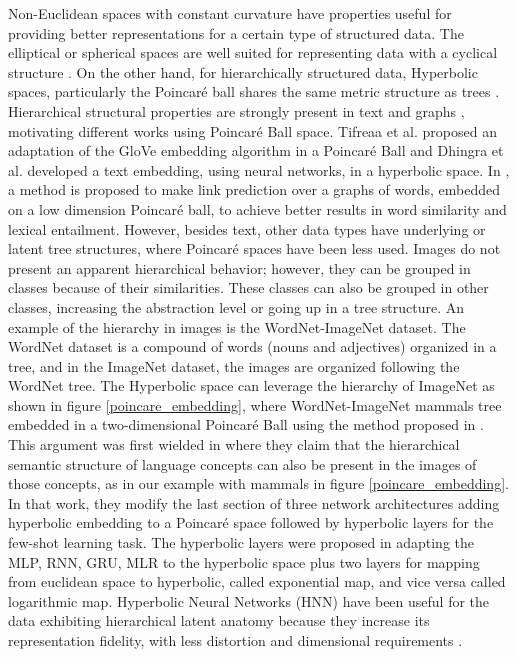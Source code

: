 \documentclass[journal]{IEEEtran}
\begin{document}
Non-Euclidean spaces with constant curvature have properties useful for providing better representations for a certain type of structured data. The elliptical or spherical spaces are well suited for representing data with a cyclical structure \cite{mixedcurva} \cite{spherical_and_hyperbolic}. On the other hand, for hierarchically structured data, Hyperbolic spaces, particularly the Poincaré ball shares the same metric structure as trees \cite{hyp_geo_comp_net}. Hierarchical structural properties are strongly present in text and graphs \cite{hyp_link_pred}\cite{hyp_graph_cnn}, motivating different works using Poincaré Ball space. Tifreaa et al. proposed an adaptation of the GloVe \cite{glove} embedding algorithm in a Poincaré Ball \cite{poincglove} and Dhingra et al. developed a text embedding, using neural networks, in a hyperbolic space\cite{embedding_text_hyp_spaces}. In  \cite{poincemb}, a method is proposed to make link prediction over a graphs of words, embedded on a low dimension Poincaré ball, to achieve better results in word similarity and lexical entailment. However, besides text, other data types have underlying or latent tree structures, where Poincaré spaces have been less used. Images do not present an apparent hierarchical behavior; however, they can be grouped in classes because of their similarities. These classes can also be grouped in other classes, increasing the abstraction level or going up in a tree structure. An example of the hierarchy in images is the WordNet-ImageNet  \cite{wordnet}  \cite{imagenet} dataset. The WordNet dataset is a compound of words (nouns and adjectives) organized in a tree, and in the ImageNet dataset, the images are organized following the WordNet tree. The Hyperbolic space can leverage the hierarchy of ImageNet as shown in figure \ref{poincare_embedding}, where WordNet-ImageNet mammals tree embedded in a two-dimensional Poincaré Ball using the method proposed in \cite{poincemb}. This argument was first wielded in \cite{hyime} where they claim that the hierarchical semantic structure of language concepts can also be present in the images of those concepts, as in our example with mammals in figure \ref{poincare_embedding}. In that work, they modify the last section of three network architectures adding hyperbolic embedding to a Poincaré space followed by hyperbolic layers for the few-shot learning task. The hyperbolic layers were proposed in \cite{hnn} adapting the MLP, RNN, GRU, MLR to the hyperbolic space plus two layers for mapping from euclidean space to hyperbolic, called exponential map, and vice versa called logarithmic map. Hyperbolic Neural Networks (HNN) have been useful for the data exhibiting hierarchical latent anatomy because they increase its representation fidelity, with less distortion and dimensional requirements \cite{mixedcurva}.\newline 
\end{document}
